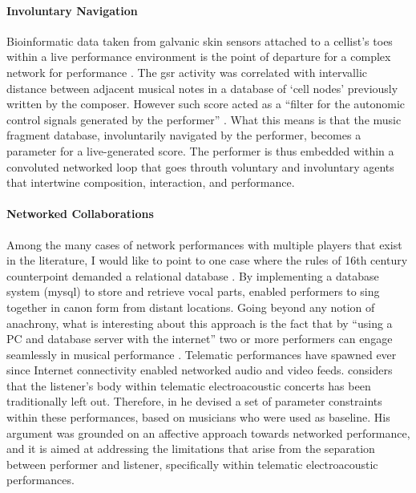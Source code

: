 {	\paragraph{Involuntary Navigation}
	Bioinformatic data taken from galvanic skin sensors attached to a cellist's toes within a live performance environment is the point of departure for a complex network for performance \parencite{icmc/bbp2372.2006.123}. The \gls{gsr} activity was correlated with intervallic distance between adjacent musical notes in a database of `cell nodes' previously written by the composer. However such score acted as a ``filter for the autonomic control signals generated by the performer'' \parencite[601]{icmc/bbp2372.2006.123}. What this means is that the music fragment database, involuntarily navigated by the performer, becomes a parameter for a live-generated score. The performer is thus embedded within a convoluted networked loop that goes throuth voluntary and involuntary agents that intertwine composition, interaction, and performance.

	\paragraph{Networked Collaborations}
	Among the many cases of network performances with multiple players that exist in the literature, I would like to point to one case where the rules of 16th century counterpoint demanded a relational database \parencite{Nakamoto2007}. By implementing a database system (\gls{mysql}) to store and retrieve vocal parts, \citeauthor{Nakamoto2007} enabled performers to sing together in canon form from distant locations. Going beyond any notion of anachrony, what is interesting about this approach is the fact that by ``using a PC and database server with the internet'' two or more performers can engage seamlessly in musical performance \parencite{Nakamoto2007}. Telematic performances have spawned ever since Internet connectivity enabled networked audio and video feeds. \textcite{icmc/bbp2372.2014.046} considers that the listener's body within telematic electroacoustic concerts has been traditionally left out. Therefore, in he devised a set of parameter constraints within these performances, based on musicians who were used as baseline. His argument was grounded on an affective approach towards networked performance, and it is aimed at addressing the limitations that arise from the separation between performer and listener, specifically within telematic electroacoustic performances.

}

